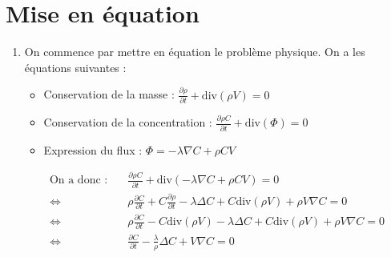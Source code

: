 \documentclass[12pt,a4paper]{article}
\begin{document}
\section*{Mise en équation}
\begin{enumerate}
    \item On commence par mettre en équation le problème physique. On a les équations suivantes :
    \begin{itemize}
        \item Conservation de la masse : $\frac{\partial \rho}{\partial t} + \text{div}(\rho V) = 0$
        \item Conservation de la concentration : $\frac{\partial \rho C}{\partial t} + \text{div}(\Phi) = 0$
        \item Expression du flux : $\Phi = -\lambda \nabla C + \rho C V$
    \end{itemize}
    
    \begin{align*}
        \text{On a donc :} \quad & \frac{\partial \rho C}{\partial t} + \text{div}(-\lambda \nabla C + \rho C V) = 0 \\
        \Leftrightarrow \quad & \rho \frac{\partial C}{\partial t} + C \frac{\partial \rho}{\partial t} - \lambda \Delta C + C \text{div}(\rho V) + \rho V \nabla C = 0 \\
        \Leftrightarrow \quad & \rho \frac{\partial C}{\partial t} - C \text{div}(\rho V) - \lambda \Delta C + C \text{div}(\rho V) + \rho V \nabla C = 0 \\
        \Leftrightarrow \quad & \frac{\partial C}{\partial t} - \frac{\lambda}{\rho} \Delta C + V \nabla C = 0
    \end{align*}

\end{enumerate}
\end{document}
